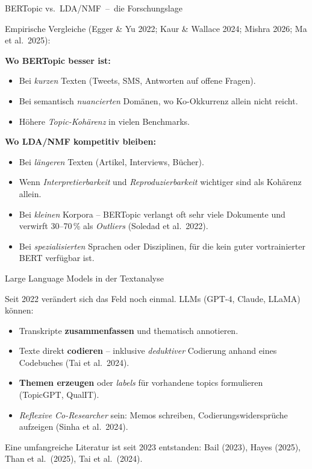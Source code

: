\documentclass[aspectratio=169,11pt]{beamer}
\newcommand{\mdash}{\,{\monodash–}\,}
\let\oldemph\emph
\renewcommand{\emph}[1]{{\color{solCyan}\oldemph{#1}}}
\let\oldtextbf\textbf
\renewcommand{\textbf}[1]{{\color{solBase3}\oldtextbf{#1}}}
\begin{document}
\begin{frame}{BERTopic vs.\ LDA/NMF \mdash{} die Forschungslage}

  Empirische Vergleiche (Egger \& Yu 2022; Kaur \& Wallace 2024;
  Mishra 2026; Ma et al.\ 2025):

  \vfill
  \textbf{Wo BERTopic besser ist:}
  \begin{itemize}
    \item Bei \emph{kurzen} Texten (Tweets, SMS, Antworten auf
          offene Fragen).
    \item Bei semantisch \emph{nuancierten} Domänen, wo
          Ko-Okkurrenz allein nicht reicht.
    \item Höhere \emph{Topic-Kohärenz} in vielen Benchmarks.
  \end{itemize}

  \vfill
  \textbf{Wo LDA/NMF kompetitiv bleiben:}
  \begin{itemize}
    \item Bei \emph{längeren} Texten (Artikel, Interviews, Bücher).
    \item Wenn \emph{Interpretierbarkeit} und \emph{Reproduzierbarkeit}
          wichtiger sind als Kohärenz allein.
    \item Bei \emph{kleinen} Korpora – BERTopic verlangt oft sehr
          viele Dokumente und verwirft 30–70\,\% als \emph{Outliers}
          (Soledad et al.\ 2022).
    \item Bei \emph{spezialisierten} Sprachen oder Disziplinen, für
          die kein guter vortrainierter BERT verfügbar ist.
  \end{itemize}

\end{frame}

\begin{frame}{Large Language Models in der Textanalyse}

  Seit 2022 verändert sich das Feld noch einmal. LLMs (GPT-4, Claude,
  LLaMA) können:

  \vfill
  \begin{itemize}
    \item Transkripte \textbf{zusammenfassen} und thematisch annotieren.
    \vfill
    \item Texte direkt \textbf{codieren} – inklusive
          \emph{deduktiver} Codierung anhand eines Codebuches
          (Tai et al.\ 2024).
    \vfill
    \item \textbf{Themen erzeugen} oder \emph{labels} für vorhandene
          topics formulieren (TopicGPT, QualIT).
    \vfill
    \item \emph{Reflexive Co-Researcher} sein: Memos schreiben,
          Codierungswidersprüche aufzeigen (Sinha et al.\ 2024).
  \end{itemize}

  \vfill
  Eine umfangreiche Literatur ist seit 2023 entstanden: Bail (2023),
  Hayes (2025), Than et al.\ (2025), Tai et al.\ (2024).

\end{frame}
\end{document}
